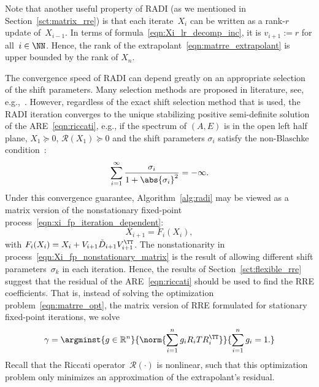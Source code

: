 Note that another useful property of RADI (as we mentioned in Section~\ref{sct:matrix_rre}) is that each iterate~$X_i$ can be written as a rank-$r$ update of~$X_{i-1}$.
In terms of formula~\eqref{eqn:Xi_lr_decomp_inc}, it is $v_{i+1} := r$ for all~$i\in\NN$.
Hence, the rank of the extrapolant~\eqref{eqn:matrre_extrapolant} is upper bounded by the rank of $X_n$.

The convergence speed of RADI can depend greatly on an appropriate selection of the shift parameters.
Many selection methods are proposed in literature, see, e.g.,~\cite{simoncini2016analysis,benner2018radi,benner2020numerical}.
However, regardless of the exact shift selection method that is used, the RADI iteration converges to the unique stabilizing positive semi-definite solution of the \ac{ARE}~\eqref{eqn:riccati}, e.g.,
if the spectrum of $(A, E)$ is in the open left half plane, $X_1 \succeq 0$, $\mathscr{R}(X_1) \succeq 0$ and the shift parameters $\sigma_i$ satisfy the non-Blaschke condition~\cite[Theorem~6.1]{massoudi2016analysis}:
\begin{equation}
	\sum_{i=1}^{\infty} \frac{ \sigma_i }{ 1 + \abs{\sigma_i}^2 } = -\infty.
	\label{eqn:nonblaschke_condition}
\end{equation}
Under this convergence guarantee, Algorithm~\ref{alg:radi}
may be viewed as a matrix version of the nonstationary fixed-point process~\eqref{eqn:xi_fp_iteration_dependent}:
\begin{equation}
	X_{i+1} = F_i(X_i)
	,
	\label{eqn:Xi_fp_nonstationary_matrix}
\end{equation}
with $F_i(X_i) = X_i + V_{i+1} \tilde{D}_{i+1} V_{i+1}^\TT$.
The nonstationarity in process~\eqref{eqn:Xi_fp_nonstationary_matrix} is the result of allowing different shift parameters~$\sigma_k$ in each iteration.
Hence, the results of Section~\ref{sct:flexible_rre} suggest that the residual of the \ac{ARE}~\eqref{eqn:riccati} should be used to find the \ac{RRE} coefficients.
That is, instead of solving the optimization problem~\eqref{eqn:matrre_opt},
the matrix version of \ac{RRE} formulated for stationary fixed-point iterations, we solve
\begin{equation}
	\gamma = \argminst{%
		g\in\mathbb R^n
	}{%
		\norm{ \sum_{i=1}^{n} g_i R_i T R_i^\TT }
	}{%
		\sum_{i=1}^{n} g_i = 1
		.
	}
	\label{eqn:matrre_opt_nonstationary}
\end{equation}
Recall that the Riccati operator~$\mathscr{R}(\cdot)$ is nonlinear,
such that this optimization problem only minimizes an approximation of the extrapolant's residual.

